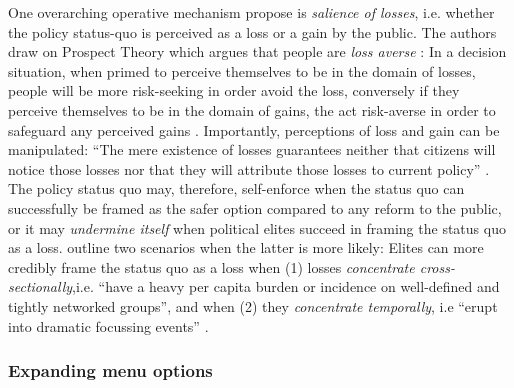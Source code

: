 \documentclass[11pt]{article}
\begin{document}
One overarching operative mechanism \textcite[][]{Jacobs2014} propose is \textit{salience of losses}, i.e. whether the policy status-quo is perceived as a loss or a gain by the public. The authors draw on Prospect Theory \parencite[][]{Kahnemann1979} which argues that people are \textit{loss averse} \parencite[][]{Tversky1991}: In a decision situation, when primed to perceive themselves to be in the domain of losses, people will be more risk-seeking in order avoid the loss, conversely if they perceive themselves to be in the domain of gains, the act risk-averse in order to safeguard any perceived gains \parencite[the latter phenomenon being know as the endowment effect, see][]{Kahnemann1991}. Importantly, perceptions of loss and gain can be manipulated: \enquote{The mere existence of losses guarantees neither that citizens will notice those losses nor that they will attribute those losses to current policy} \parencite[][p. 447]{Jacobs2014}. The policy status quo may, therefore, self-enforce when the status quo can successfully be framed as the safer option compared to any reform to the public, or it may \textit{undermine itself} when political elites succeed in framing the status quo as a loss. \textcite[][]{Jacobs2014} outline two scenarios when the latter is more likely: Elites can more credibly frame the status quo as a loss when (1) losses \textit{concentrate cross-sectionally},i.e. \enquote{have a heavy per capita burden or incidence on well-defined and tightly networked groups}, and when (2) they \textit{concentrate temporally}, i.e \enquote{erupt into dramatic focussing events} \parencite[][p. 448]{Jacobs2014}.

\subsubsection*{Expanding menu options}
\end{document}

